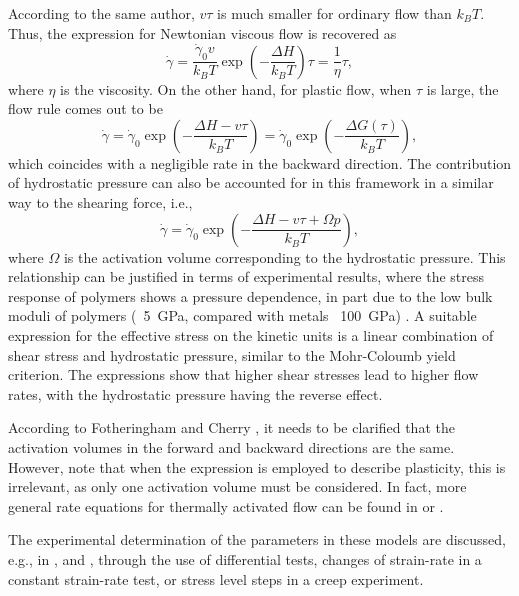 According to the same author, $v\tau$ is much smaller for ordinary flow than $k_B T$.
Thus, the expression for Newtonian viscous flow is recovered as
\begin{equation}
  \label{eq:newton_fluid_flow_rule_scalar}
	\dot \gamma = \frac{\dot \gamma_0 v}{k_B T}\exp\left(-\frac{\Delta H}{k_BT}\right)\tau=\frac{1}{\eta}\tau,
\end{equation}
where $\eta$ is the viscosity.
On the other hand, for plastic flow, when $\tau$ is large, the flow rule comes out to be
\begin{equation}
\label{eq:flow_rule_thermally_activated}
	\dot\gamma = \dot \gamma_0 \exp\left(-\frac{\Delta H - v \tau}{k_B T}\right)=\dot \gamma_0 \exp\left(-\frac{\Delta G(\tau)}{k_B T}\right),
\end{equation}
which coincides with a negligible rate in the backward direction.
The contribution of hydrostatic pressure can also be accounted for in this framework in a similar way to the shearing force, i.e.,
\begin{equation}
  \label{eq:eyring_w_pressure}
	\dot\gamma = \dot\gamma_0 \exp\left(-\frac{\Delta H - v \tau + \Omega p}{k_B T}\right),
\end{equation}
where $\Omega$ is the activation volume corresponding to the hydrostatic pressure.
This relationship can be justified in terms of experimental results, where the stress response of polymers shows a pressure dependence, in part due to the low bulk moduli of polymers (~\SI{5}{\giga\pascal}, compared with metals ~\SI{100}{\giga\pascal}) \citep{wardIntroductionMechanicalProperties2004}.
A suitable expression for the effective stress on the kinetic units is a linear combination of shear stress and hydrostatic pressure, similar to the Mohr-Coloumb yield criterion.
The expressions show that higher shear stresses lead to higher flow rates, with the hydrostatic pressure having the reverse effect.

According to Fotheringham and Cherry \citep{fotheringhamRoleRecoveryForces1978}, it needs to be clarified that the activation volumes in the forward and backward directions are the same.
However, note that when the expression is employed to describe plasticity, this is irrelevant, as only one activation volume must be considered.
In fact, more general rate equations for thermally activated flow can be found in \cite{brinkmanMechanicalThermodynamicalTheory1957} or \cite{kocks1975thermodynamics}.

The experimental determination of the parameters in these models are discussed, e.g., in \cite{evansThermallyActivatedDeformation1969}, \cite{conradAthermalComponentFlow1970} and \cite{kocks1975thermodynamics}, through the use of differential tests, changes of strain-rate in a constant strain-rate test, or stress level steps in a creep experiment.

